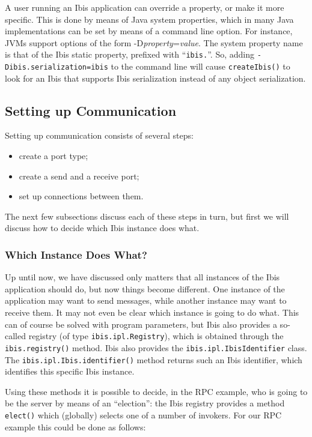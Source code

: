 \documentclass[10pt]{article}
\newcommand{\mysubsubsection}[1]{\subsubsection{#1}\label{#1}}
\begin{document}
\noindent
A user running an Ibis application can override a property, or make
it more specific. This is done by means of Java system properties,
which in many Java implementations can be set by means of a command
line option.  For instance, JVMs support options of the form
-D\emph{property}=\emph{value}.  The system property name is that
of the Ibis static property, prefixed with ``\texttt{ibis.}''.  So,
adding \texttt{-Dibis.serialization=ibis} to the command line will cause
\texttt{createIbis()} to look for an Ibis that supports Ibis serialization
instead of any object serialization.

\subsection{Setting up Communication}

Setting up communication consists of several steps:
\begin{itemize}
\item
create a port type;
\item
create a send and a receive port;
\item
set up connections between them.
\end{itemize}

\noindent
The next few subsections discuss each of these steps in turn, but
first we will discuss how to decide which Ibis instance does what.

\mysubsubsection{Which Instance Does What?}

Up until now, we have discussed only matters that all instances of
the Ibis application should do, but now things become different.
One instance of the application may want to send messages, while
another instance may want to receive them.
It may not even be clear which instance is going to do what.
This can of course be solved with program parameters, but Ibis
also provides a so-called registry (of type
\texttt{ibis.ipl.Registry}), which is obtained through the
\texttt{ibis.registry()} method.
Ibis also provides the \texttt{ibis.ipl.IbisIdentifier} class.
The \texttt{ibis.ipl.Ibis.identifier()} method returns such an
Ibis identifier, which identifies this specific Ibis instance.

Using these methods it is possible to decide, in the RPC example,
who is going to be the server by means of an ``election'': the Ibis
registry provides a method \texttt{elect()} which (globally) selects
one of a number of invokers.  For our RPC example this could be done as
follows:
\end{document}
